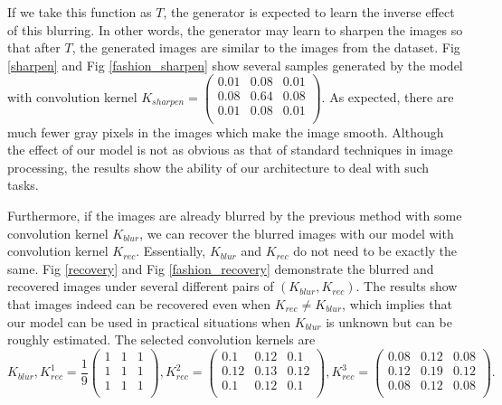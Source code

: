 \documentclass{article}
\begin{document}
If we take this function as $T$, the generator is expected to learn the inverse effect of this blurring. In other words, the generator may learn to sharpen the images so that after $T$, the generated images are similar to the images from the dataset.
Fig \ref{sharpen} and Fig \ref{fashion_sharpen} show several samples generated by the model with convolution kernel $K_{sharpen}=\left(
\begin{array}{ccc}
 0.01 & 0.08 & 0.01 \\
 0.08 & 0.64 & 0.08 \\
 0.01 & 0.08 & 0.01 \\
\end{array}
\right)$. As expected, there are much fewer gray pixels in the images which make the image smooth. Although the effect of our model is not as obvious as that of standard techniques in image processing, the results show the ability of our architecture to deal with such tasks.


Furthermore, if the images are already blurred by the previous method with some convolution kernel $K_{blur}$, we can recover the blurred images with our model with convolution kernel $K_{rec}$. Essentially, $K_{blur}$ and $K_{rec}$ do not need to be exactly the same. Fig \ref{recovery} and Fig \ref{fashion_recovery} demonstrate the blurred and recovered images under several different pairs of $(K_{blur}, K_{rec})$. The results show that images indeed can be recovered even when $K_{rec}\neq K_{blur}$, which implies that our model can be used in practical situations when $K_{blur}$ is unknown but can be roughly estimated. The selected convolution kernels are
\begin{equation}
K_{blur},K_{rec}^1=\frac19\left(
\begin{array}{ccc}
 1 & 1 & 1 \\
 1 & 1 & 1 \\
 1 & 1 & 1 \\
\end{array}
\right), K_{rec}^2=\left(
\begin{array}{ccc}
 0.1 & 0.12 & 0.1 \\
 0.12 & 0.13 & 0.12 \\
 0.1 & 0.12 & 0.1 \\
\end{array}
\right), K_{rec}^3=\left(
\begin{array}{ccc}
 0.08 & 0.12 & 0.08 \\
 0.12 & 0.19 & 0.12 \\
 0.08 & 0.12 & 0.08 \\
\end{array}
\right).
\end{equation}
\end{document}
